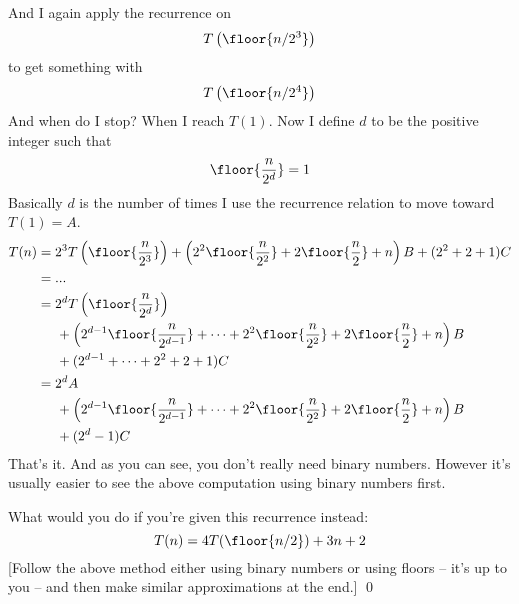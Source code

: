 And I again apply the recurrence on  
\[
      T \left( 
              \floor{
               n/2^3 
              } 
        \right)  
\]
to get something with
\[
      T \left( 
              \floor{
               n/2^4 
              } 
        \right)  
\]
And when do I stop?
When I reach $T(1)$.
Now I define $d$ to be the positive integer such that 
\[
\floor{\frac{n}{2^d}} = 1
\]
Basically $d$ is the number of times I use the recurrence relation
to move toward $T(1) = A$.
\begin{align*}
T(n) 
&= 2^3 
      T \left( 
              \floor{
               \frac{n}{2^3} 
              } 
        \right)  
   + \left(
             2^2\floor{\frac{n}{2^2}}
             + 2 
         \floor{
          \frac{n}{2}
         } 
         + n
      \right)B 
   + (2^2 + 2 + 1)C \\
&= ... \\
&= 2^d
      T \left( 
              \floor{
               \frac{n}{2^d} 
              } 
        \right) \\ 
&\hspace{0.5cm}   + \left(
             2^{d - 1} \floor{\frac{n}{2^{d-1}}}
 + \cdots + 
             2^2\floor{\frac{n}{2^2}}
             + 2 
         \floor{
          \frac{n}{2}
         } 
         + n
      \right)B \\
&\hspace{0.5cm}  
   + (2^{d-1} + \cdots + 2^2 + 2 + 1)C \\
&= 2^d A \\ 
&\hspace{0.5cm}   + \left(
             2^{d - 1} \floor{\frac{n}{2^{d-1}}}
 + \cdots + 
             2^2\floor{\frac{n}{2^2}}
             + 2 
         \floor{
          \frac{n}{2}
         } 
         + n
      \right)B \\
&\hspace{0.5cm}  
   + (2^d - 1)C \\
\end{align*}
That's it.
And as you can see, you don't really need binary numbers.
However it's usually easier to see the above computation
using binary numbers first.

\begin{ex}
What would you do if you're given this recurrence instead:
\[
T(n) = 4T(\floor{n/2}) + 3n + 2
\]
[Follow the above method either using binary numbers or using
floors -- it's up to you -- and then make similar
approximations at the end.]
\qed
\end{ex}


